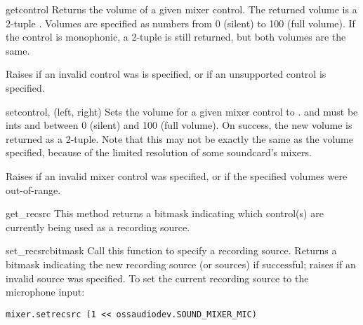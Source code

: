 \begin{methoddesc}{get}{control}
Returns the volume of a given mixer control.  The returned volume is a
2-tuple .  Volumes are specified as
numbers from 0 (silent) to 100 (full volume).  If the control is
monophonic, a 2-tuple is still returned, but both volumes are
the same.

Raises  if an invalid control was is specified,
or  if an unsupported control is specified.
\end{methoddesc}

\begin{methoddesc}{set}{control, (left, right)}
Sets the volume for a given mixer control to .
 and  must be ints and between 0 (silent) and 100
(full volume).  On success, the new volume is returned as a 2-tuple.
Note that this may not be exactly the same as the volume specified,
because of the limited resolution of some soundcard's mixers.

Raises  if an invalid mixer control was
specified, or if the specified volumes were out-of-range.
\end{methoddesc}

\begin{methoddesc}{get_recsrc}{}
This method returns a bitmask indicating which control(s) are
currently being used as a recording source.
\end{methoddesc}

\begin{methoddesc}{set_recsrc}{bitmask}
Call this function to specify a recording source.  Returns a bitmask
indicating the new recording source (or sources) if successful; raises
 if an invalid source was specified.  To set the current
recording source to the microphone input:

\begin{verbatim}
mixer.setrecsrc (1 << ossaudiodev.SOUND_MIXER_MIC)
\end{verbatim}
\end{methoddesc}



